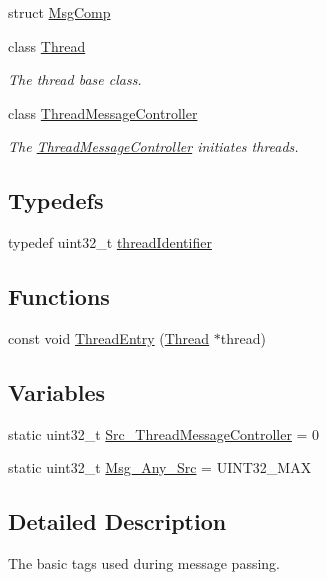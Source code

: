 \begin{DoxyCompactItemize}
struct \hyperlink{struct_m_p_e_1_1_msg_comp}{Msg\+Comp}
\item 
class \hyperlink{class_m_p_e_1_1_thread}{Thread}
\begin{DoxyCompactList}\small\item\em The thread base class. \end{DoxyCompactList}\item 
class \hyperlink{class_m_p_e_1_1_thread_message_controller}{Thread\+Message\+Controller}
\begin{DoxyCompactList}\small\item\em The \hyperlink{class_m_p_e_1_1_thread_message_controller}{Thread\+Message\+Controller} initiates threads. \end{DoxyCompactList}\end{DoxyCompactItemize}
\subsection*{Typedefs}
\begin{DoxyCompactItemize}
\item 
typedef uint32\+\_\+t \hyperlink{namespace_m_p_e_a16447295e3105bd2ba2a9ea303566175}{thread\+Identifier}
\end{DoxyCompactItemize}
\subsection*{Functions}
\begin{DoxyCompactItemize}
\item 
const void \hyperlink{namespace_m_p_e_a9485a8e81a058e9f485fa13c60c6d1ef}{Thread\+Entry} (\hyperlink{class_m_p_e_1_1_thread}{Thread} $\ast$thread)
\end{DoxyCompactItemize}
\subsection*{Variables}
\begin{DoxyCompactItemize}
\item 
static uint32\+\_\+t \hyperlink{namespace_m_p_e_a6874547713c4758aae159fa87c365d8e}{Src\+\_\+\+Thread\+Message\+Controller} = 0
\item 
static uint32\+\_\+t \hyperlink{namespace_m_p_e_a0a698f47d1ab10c44a414685c36494f1}{Msg\+\_\+\+Any\+\_\+\+Src} = U\+I\+N\+T32\+\_\+\+M\+AX
\end{DoxyCompactItemize}


\subsection{Detailed Description}
The basic tags used during message passing. 

